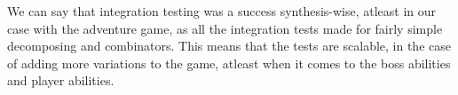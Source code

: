 We can say that integration testing was a success synthesis-wise, atleast in our case with the adventure game, as all the integration tests made for fairly simple decomposing and combinators. This means that the tests are scalable, in the case of adding more variations to the game, atleast when it comes to the boss abilities and player abilities. 